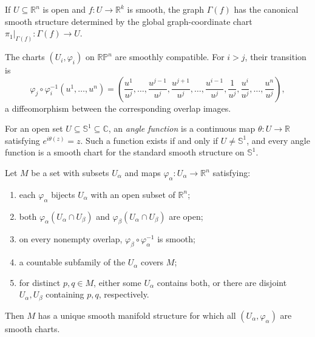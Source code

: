\begin{example}
\label{ex:1-30}





If $U\subseteq\mathbb R^n$ is open and $f:U\to\mathbb R^k$ is smooth, the
graph $\Gamma(f)$ has the canonical smooth structure determined by the global
graph-coordinate chart $\pi_1|_{\Gamma(f)}:\Gamma(f)\to U$.
\end{example}

\begin{example}
\label{ex:1-33}





The charts $(U_i,\varphi_i)$ on $\mathbb{RP}^n$ are smoothly compatible. For
$i>j$, their transition is
\[
\varphi_j\circ\varphi_i^{-1}(u^1,\ldots,u^n)
=\left(\frac{u^1}{u^j},\ldots,\frac{u^{j-1}}{u^j},
\frac{u^{j+1}}{u^j},\ldots,\frac{u^{i-1}}{u^j},
\frac1{u^j},\frac{u^i}{u^j},\ldots,\frac{u^n}{u^j}\right),
\]
a diffeomorphism between the corresponding overlap images.
\end{example}

\begin{proposition}
\label{prob:1-8}




For an open set $U\subseteq\mathbb S^1\subseteq\mathbb C$, an
\emph{angle function} is a continuous map $\theta:U\to\mathbb R$ satisfying
$e^{i\theta(z)}=z$. Such a function exists if and only if
$U\neq\mathbb S^1$, and every angle function is a smooth chart for the
standard smooth structure on $\mathbb S^1$.
\end{proposition}

\begin{lemma}
\label{lem:1-35}




Let $M$ be a set with subsets $U_\alpha$ and maps
$\varphi_\alpha:U_\alpha\to\mathbb R^n$ satisfying:
\begin{enumerate}
\item each $\varphi_\alpha$ bijects $U_\alpha$ with an open subset of
$\mathbb R^n$;
\item both $\varphi_\alpha(U_\alpha\cap U_\beta)$ and
$\varphi_\beta(U_\alpha\cap U_\beta)$ are open;
\item on every nonempty overlap,
$\varphi_\beta\circ\varphi_\alpha^{-1}$ is smooth;
\item a countable subfamily of the $U_\alpha$ covers $M$;
\item for distinct $p,q\in M$, either some $U_\alpha$ contains both, or there
are disjoint $U_\alpha,U_\beta$ containing $p,q$, respectively.
\end{enumerate}
Then $M$ has a unique smooth manifold structure for which all
$(U_\alpha,\varphi_\alpha)$ are smooth charts.
\end{lemma}

